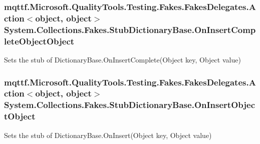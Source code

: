 \hypertarget{class_system_1_1_collections_1_1_fakes_1_1_stub_dictionary_base_ae5e5a7d04818a11af79a44b2cfb3db43}{
\subsubsection[{On\-Insert\-Complete\-Object\-Object}]{\setlength{\rightskip}{0pt plus 5cm}mqttf.\-Microsoft.\-Quality\-Tools.\-Testing.\-Fakes.\-Fakes\-Delegates.\-Action$<$object, object$>$ System.\-Collections.\-Fakes.\-Stub\-Dictionary\-Base.\-On\-Insert\-Complete\-Object\-Object}}\label{class_system_1_1_collections_1_1_fakes_1_1_stub_dictionary_base_ae5e5a7d04818a11af79a44b2cfb3db43}


Sets the stub of Dictionary\-Base.\-On\-Insert\-Complete(\-Object key, Object value)

\hypertarget{class_system_1_1_collections_1_1_fakes_1_1_stub_dictionary_base_a4bf6a8547afdabbd7402447f95bf1882}{
\subsubsection[{On\-Insert\-Object\-Object}]{\setlength{\rightskip}{0pt plus 5cm}mqttf.\-Microsoft.\-Quality\-Tools.\-Testing.\-Fakes.\-Fakes\-Delegates.\-Action$<$object, object$>$ System.\-Collections.\-Fakes.\-Stub\-Dictionary\-Base.\-On\-Insert\-Object\-Object}}\label{class_system_1_1_collections_1_1_fakes_1_1_stub_dictionary_base_a4bf6a8547afdabbd7402447f95bf1882}


Sets the stub of Dictionary\-Base.\-On\-Insert(\-Object key, Object value)


